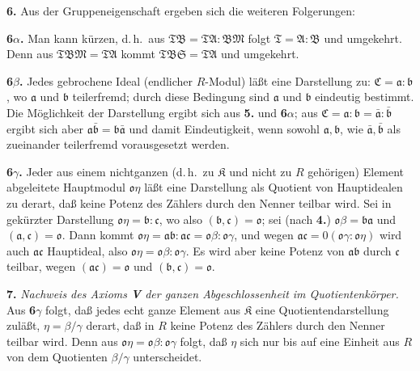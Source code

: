 \documentclass[12pt,a4paper]{article}
\newcommand{\fK}{\mathfrak{K}}
\theoremstyle{plain}
\theoremstyle{definition}
\theoremstyle{remark}
\begin{document}
\medskip
\noindent
\textbf{6.} Aus der Gruppeneigenschaft ergeben sich die weiteren Folgerungen:

\smallskip
\noindent
\textbf{6$\alpha$.} Man kann kürzen, d.\,h.\ aus $\mathfrak{T}\mathfrak{B} = \mathfrak{T}\mathfrak{A}:\mathfrak{B}\mathfrak{M}$ folgt $\mathfrak{T} = \mathfrak{A}:\mathfrak{B}$ und umgekehrt. Denn aus $\mathfrak{T}\mathfrak{B}\mathfrak{M} = \mathfrak{T}\mathfrak{A}$ kommt $\mathfrak{T}\mathfrak{B}\mathfrak{S} = \mathfrak{T}\mathfrak{A}$ und umgekehrt.

\smallskip
\noindent
\textbf{6$\beta$.} Jedes gebrochene Ideal (endlicher $R$-Modul) läßt eine Darstellung zu: $\mathfrak{C} = \mathfrak{a}:\mathfrak{b}$, wo $\mathfrak{a}$ und $\mathfrak{b}$ teilerfremd; durch diese Bedingung sind $\mathfrak{a}$ und $\mathfrak{b}$ eindeutig bestimmt. Die Möglichkeit der Darstellung ergibt sich aus \textbf{5.} und \textbf{6$\alpha$}; aus $\mathfrak{C} = \mathfrak{a}:\mathfrak{b} = \bar{\mathfrak{a}}:\bar{\mathfrak{b}}$ ergibt sich aber $\mathfrak{a}\bar{\mathfrak{b}} = \mathfrak{b}\bar{\mathfrak{a}}$ und damit Eindeutigkeit, wenn sowohl $\mathfrak{a}, \mathfrak{b}$, wie $\bar{\mathfrak{a}}, \bar{\mathfrak{b}}$ als zueinander teilerfremd vorausgesetzt werden.

\smallskip
\noindent
\textbf{6$\gamma$.} Jeder aus einem nichtganzen (d.\,h.\ zu $\fK$ und nicht zu $R$ gehörigen) Element abgeleitete Hauptmodul $\mathfrak{o}\eta$ läßt eine Darstellung als Quotient von Hauptidealen zu derart, daß keine Potenz des Zählers durch den Nenner teilbar wird. Sei in gekürzter Darstellung $\mathfrak{o}\eta = \mathfrak{b}:\mathfrak{c}$, wo also $(\mathfrak{b}, \mathfrak{c}) = \mathfrak{o}$; sei (nach \textbf{4.}) $\mathfrak{o}\beta = \mathfrak{b}\mathfrak{a}$ und $(\mathfrak{a}, \mathfrak{c}) = \mathfrak{o}$. Dann kommt $\mathfrak{o}\eta = \mathfrak{a}\mathfrak{b}:\mathfrak{a}\mathfrak{c} = \mathfrak{o}\beta:\mathfrak{o}\gamma$, und wegen $\mathfrak{a}\mathfrak{c} = 0(\mathfrak{o}\gamma:\mathfrak{o}\eta)$ wird auch $\mathfrak{a}\mathfrak{c}$ Hauptideal, also $\mathfrak{o}\eta = \mathfrak{o}\beta:\mathfrak{o}\gamma$. Es wird aber keine Potenz von $\mathfrak{a}\mathfrak{b}$ durch $\mathfrak{c}$ teilbar, wegen $(\mathfrak{a}\mathfrak{c}) = \mathfrak{o}$ und $(\mathfrak{b}, \mathfrak{c}) = \mathfrak{o}$.

\medskip
\noindent
\textbf{7.} \textit{Nachweis des Axioms \textbf{V} der ganzen Abgeschlossenheit im Quotientenkörper.} Aus \textbf{6$\gamma$} folgt, daß jedes echt ganze Element aus $\fK$ eine Quotientendarstellung zuläßt, $\eta = \beta/\gamma$ derart, daß in $R$ keine Potenz des Zählers durch den Nenner teilbar wird. Denn aus $\mathfrak{o}\eta = \mathfrak{o}\beta:\mathfrak{o}\gamma$ folgt, daß $\eta$ sich nur bis auf eine Einheit aus $R$ von dem Quotienten $\beta/\gamma$ unterscheidet.
\end{document}
